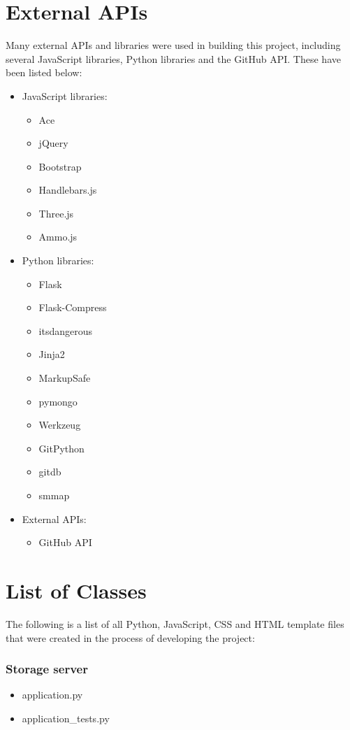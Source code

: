 \section{External APIs}
Many external APIs and libraries were used in building this project, including several JavaScript libraries, Python libraries and the GitHub API. These have been listed below:

\begin{itemize}
	\itemsep-0.6em
	\item JavaScript libraries:
	\begin{itemize}
		\itemsep-0.6em
		\item Ace
		\item jQuery
		\item Bootstrap
		\item Handlebars.js
		\item Three.js
		\item Ammo.js
	\end{itemize}
	
	\item Python libraries:
	\begin{itemize}
		\itemsep-0.6em
		\item Flask
		\item Flask-Compress
		\item itsdangerous
		\item Jinja2
		\item MarkupSafe
		\item pymongo
		\item Werkzeug
		\item GitPython
		\item gitdb
		\item smmap
	\end{itemize}

	\item External APIs:
	\begin{itemize}
		\itemsep-0.6em
		\item GitHub API
	\end{itemize}
\end{itemize}

\section{List of Classes}
The following is a list of all Python, JavaScript, CSS and HTML template files that were created in the process of developing the project:

\subsubsection{Storage server}
\begin{itemize}
	\itemsep-0.6em
	\item application.py
	\item application\_tests.py
\end{itemize}
